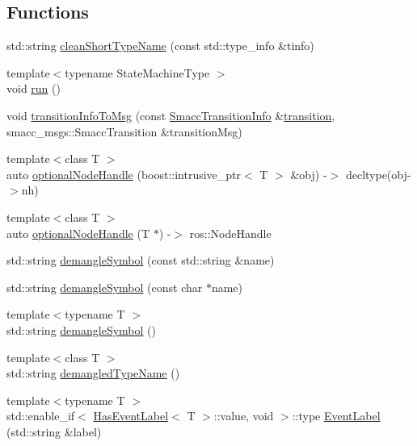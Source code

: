 \subsection*{Functions}
\begin{DoxyCompactItemize}
\item 
std\+::string \hyperlink{namespacesmacc_a09b297b1cdb9aae93a958f323431464a}{clean\+Short\+Type\+Name} (const std\+::type\+\_\+info \&tinfo)
\item 
{\footnotesize template$<$typename State\+Machine\+Type $>$ }\\void \hyperlink{namespacesmacc_a47ac3b8d2968b1ba4152afd64ab66bd0}{run} ()
\item 
void \hyperlink{namespacesmacc_a6cda75a51f4a5e29d0a64effb800fb61}{transition\+Info\+To\+Msg} (const \hyperlink{structsmacc_1_1SmaccTransitionInfo}{Smacc\+Transition\+Info} \&\hyperlink{classsmacc_1_1transition}{transition}, smacc\+\_\+msgs\+::\+Smacc\+Transition \&transition\+Msg)
\item 
{\footnotesize template$<$class T $>$ }\\auto \hyperlink{namespacesmacc_aaf5c46d2834edc391571efd0acd05e6f}{optional\+Node\+Handle} (boost\+::intrusive\+\_\+ptr$<$ T $>$ \&obj) -\/$>$ decltype(obj-\/$>$nh)
\item 
{\footnotesize template$<$class T $>$ }\\auto \hyperlink{namespacesmacc_aae43df8cb9ee66ed75e049cb8a7db33c}{optional\+Node\+Handle} (T $\ast$) -\/$>$ ros\+::\+Node\+Handle
\item 
std\+::string \hyperlink{namespacesmacc_a458f5e70d468824fbcd66cc7729deaa8}{demangle\+Symbol} (const std\+::string \&name)
\item 
std\+::string \hyperlink{namespacesmacc_a0b2684b209c8ebb043e0cff3800cc299}{demangle\+Symbol} (const char $\ast$name)
\item 
{\footnotesize template$<$typename T $>$ }\\std\+::string \hyperlink{namespacesmacc_a4dd421d5d4e7617fcf4a9a756797adda}{demangle\+Symbol} ()
\item 
{\footnotesize template$<$class T $>$ }\\std\+::string \hyperlink{namespacesmacc_a78b16538b666c48efe324eec61cc15d7}{demangled\+Type\+Name} ()
\item 
{\footnotesize template$<$typename T $>$ }\\std\+::enable\+\_\+if$<$ \hyperlink{classsmacc_1_1HasEventLabel}{Has\+Event\+Label}$<$ T $>$\+::value, void $>$\+::type \hyperlink{namespacesmacc_a718cd7f34605a7d59777341924cbfe7e}{Event\+Label} (std\+::string \&label)

\end{DoxyCompactItemize}
